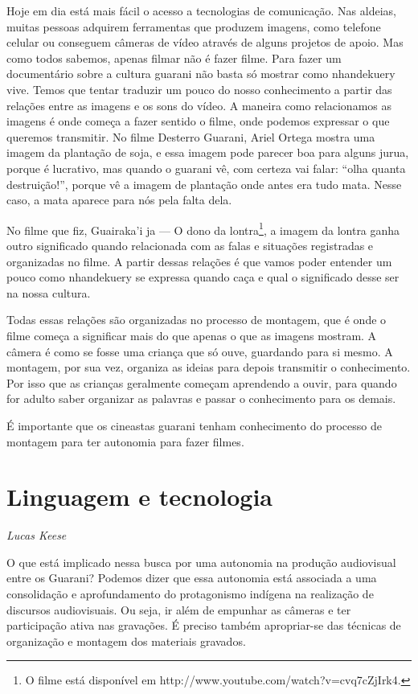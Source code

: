 Hoje em dia está mais fácil o acesso a tecnologias de comunicação. Nas
aldeias, muitas pessoas adquirem ferramentas que produzem imagens, como
telefone celular ou conseguem câmeras de vídeo através de alguns
projetos de apoio. Mas como todos sabemos, apenas filmar não é fazer
filme. Para fazer um documentário sobre a cultura guarani não basta só
mostrar como nhandekuery vive. Temos que tentar traduzir um pouco do
nosso conhecimento a partir das relações entre as imagens e os sons do
vídeo. A maneira como relacionamos as imagens é onde começa a fazer
sentido o filme, onde podemos expressar o que queremos transmitir. No
filme Desterro Guarani, Ariel Ortega mostra uma imagem da plantação de
soja, e essa imagem pode parecer boa para alguns jurua, porque é
lucrativo, mas quando o guarani vê, com certeza vai falar: ``olha quanta
destruição!'', porque vê a imagem de plantação onde antes era tudo mata.
Nesse caso, a mata aparece para nós pela falta dela. 

No filme que fiz, Guairaka’i ja — O dono da lontra\footnote{O filme está
disponível em http://www.youtube.com/watch?v=cvq7cZjIrk4.},
a imagem da lontra ganha outro significado quando relacionada com as
falas e situações registradas e organizadas no filme. A partir dessas
relações é que vamos poder entender um pouco como nhandekuery se
expressa quando caça e qual o significado desse ser na nossa cultura. 

Todas essas relações são organizadas no processo de montagem, que é onde
o filme começa a significar mais do que apenas o que as imagens
mostram. A câmera é como se fosse uma criança que só ouve, guardando
para si mesmo. A montagem, por sua vez, organiza as ideias para depois
transmitir o conhecimento. Por isso que as crianças geralmente começam
aprendendo a ouvir, para quando for adulto saber organizar as palavras
e passar o conhecimento para os demais.

É importante que os cineastas guarani tenham conhecimento do processo de
montagem para ter autonomia para fazer filmes. 

\chapter{Linguagem e tecnologia}
\begin{flushright}
\emph{Lucas Keese}
\end{flushright}
\medskip

O que está implicado nessa busca por uma autonomia na produção
audiovisual entre os Guarani? Podemos dizer que essa autonomia está
associada a uma consolidação e aprofundamento do protagonismo indígena
na realização de discursos audiovisuais. Ou seja, ir além de empunhar
as câmeras e ter participação ativa nas gravações. É preciso também
apropriar-se das técnicas de organização e montagem dos materiais
gravados.

